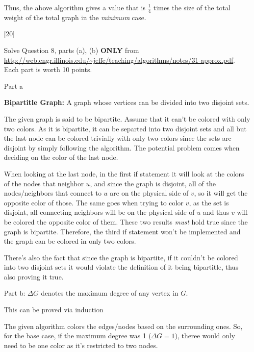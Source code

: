 \documentclass[addpoints]{exam}
\begin{document}
\begin{questions}
\begin{parts}
\begin{solution}
Thus, the above algorithm gives a value that is $\frac{1}{4}$ times the size of the total weight of the total graph in the {\em minimum} case.
\end{solution}

  \end{parts}

[20]

Solve Question 8, parts (a), (b) \textbf{ONLY} from
\url{http://web.engr.illinois.edu/~jeffe/teaching/algorithms/notes/31-approx.pdf}. Each
part is worth 10 points. 

\begin{solution}
Part a

{\bf Bipartitle Graph:} A graph whose vertices can be divided into two disjoint sets.

The given graph is said to be bipartite. Assume that it can't be colored with only two colors. As it is bipartite, it can be separted into two disjoint sets and all but the last node can be colored trivially with only two colors since the sets are disjoint by simply following the algorithm. The potential problem comes when deciding on the color of the last node.

When looking at the last node, in the first if statement it will look at the colors of the nodes that neighbor $u$, and since the graph is disjoint, all of the nodes/neighbors that connect to $u$ are on the physical side of $v$, so it will get the opposite color of those. The same goes when trying to color $v$, as the set is disjoint, all connecting neighbors will be on the physical side of $u$ and thus $v$ will be colored the opposite color of them. These two results {\em must} hold true since the graph is bipartite. Therefore, the third if statement won't be implemented and the graph can be colored in only two colors.

There's also the fact that since the graph is bipartite, if it couldn't be colored into two disjoint sets it would violate the definition of it being bipartitle, thus also proving it true.

\end{solution}

\begin{solution}
Part b: $\Delta G$ denotes the maximum degree of any vertex in $G$.

This can be proved via induction

The given algorithm colors the edges/nodes based on the surrounding ones. So, for the base case, if the maximum degree was 1 ($\Delta G = 1$), theree would only need to be one color as it's restricted to two nodes.


\end{solution}
\end{questions}
\end{document}
